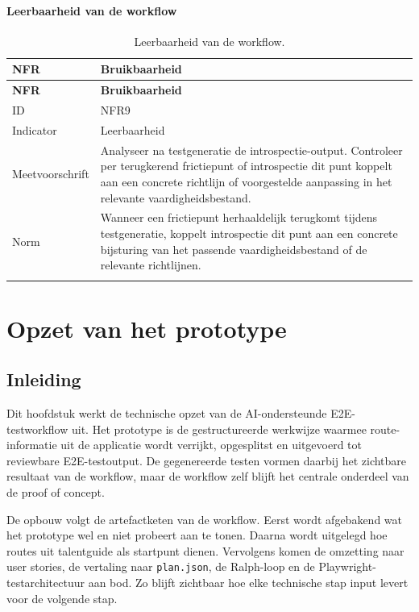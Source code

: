 \subsubsection{Leerbaarheid van de workflow}

\begin{longtable}{p{}p{}}
    \toprule
    \textbf{NFR} & \textbf{Bruikbaarheid} \\
    \midrule
    \endfirsthead
    
    \toprule
    \textbf{NFR} & \textbf{Bruikbaarheid} \\
    \midrule
    \endhead
    
    ID & NFR9 \\
    \midrule
    Indicator & Leerbaarheid \\
    \midrule
    Meetvoorschrift & Analyseer na testgeneratie de introspectie-output. Controleer per terugkerend frictiepunt of introspectie dit punt koppelt aan een concrete richtlijn of voorgestelde aanpassing in het relevante vaardigheidsbestand. \\
    \midrule
    Norm & Wanneer een frictiepunt herhaaldelijk terugkomt tijdens testgeneratie, koppelt introspectie dit punt aan een concrete bijsturing van het passende vaardigheidsbestand of de relevante richtlijnen. \\
    
    \bottomrule
    \caption[NFR9: leerbaarheid]{Leerbaarheid van de workflow.}
    \label{tab:nfr-leerbaarheid}
\end{longtable}



\chapter{Opzet van het prototype}
\label{ch:fase3}

\section{Inleiding}

Dit hoofdstuk werkt de technische opzet van de AI-ondersteunde E2E-testworkflow uit. Het prototype is de gestructureerde werkwijze waarmee route-informatie uit de applicatie wordt verrijkt, opgesplitst en uitgevoerd tot reviewbare E2E-testoutput. De gegenereerde testen vormen daarbij het zichtbare resultaat van de workflow, maar de workflow zelf blijft het centrale onderdeel van de proof of concept.

De opbouw volgt de artefactketen van de workflow. Eerst wordt afgebakend wat het prototype wel en niet probeert aan te tonen. Daarna wordt uitgelegd hoe routes uit talentguide als startpunt dienen. Vervolgens komen de omzetting naar user stories, de vertaling naar \texttt{plan.json}, de Ralph-loop en de Playwright-testarchitectuur aan bod. Zo blijft zichtbaar hoe elke technische stap input levert voor de volgende stap.

